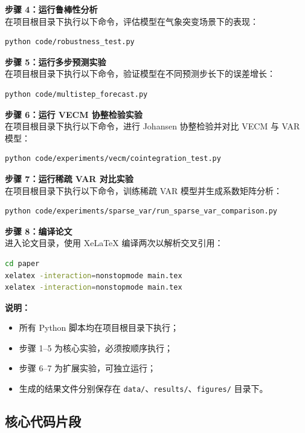 \documentclass[UTF8,a4paper,12pt]{ctexart}
\begin{document}
\textbf{步骤 4：运行鲁棒性分析}\\
在项目根目录下执行以下命令，评估模型在气象突变场景下的表现：
\begin{lstlisting}[language=bash]
python code/robustness_test.py
\end{lstlisting}

\textbf{步骤 5：运行多步预测实验}\\
在项目根目录下执行以下命令，验证模型在不同预测步长下的误差增长：
\begin{lstlisting}[language=bash]
python code/multistep_forecast.py
\end{lstlisting}

\textbf{步骤 6：运行 VECM 协整检验实验}\\
在项目根目录下执行以下命令，进行 Johansen 协整检验并对比 VECM 与 VAR 模型：
\begin{lstlisting}[language=bash]
python code/experiments/vecm/cointegration_test.py
\end{lstlisting}

\textbf{步骤 7：运行稀疏 VAR 对比实验}\\
在项目根目录下执行以下命令，训练稀疏 VAR 模型并生成系数矩阵分析：
\begin{lstlisting}[language=bash]
python code/experiments/sparse_var/run_sparse_var_comparison.py
\end{lstlisting}

\textbf{步骤 8：编译论文}\\
进入论文目录，使用 XeLaTeX 编译两次以解析交叉引用：
\begin{lstlisting}[language=bash]
cd paper
xelatex -interaction=nonstopmode main.tex
xelatex -interaction=nonstopmode main.tex
\end{lstlisting}

\noindent\textbf{说明：}
\begin{itemize}[nosep,leftmargin=2em]
  \item 所有 Python 脚本均在项目根目录下执行；
  \item 步骤 1--5 为核心实验，必须按顺序执行；
  \item 步骤 6--7 为扩展实验，可独立运行；
  \item 生成的结果文件分别保存在 \texttt{data/}、\texttt{results/}、\texttt{figures/} 目录下。
\end{itemize}

\subsection{核心代码片段}
\end{document}
